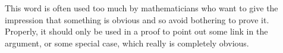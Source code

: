 This word is often used too much by mathematicians
who want to give the impression that something is 
obvious and so avoid bothering to prove it.
Properly, it should only be used in a proof to
point out some link in the argument, or some special case,
which really is completely obvious.